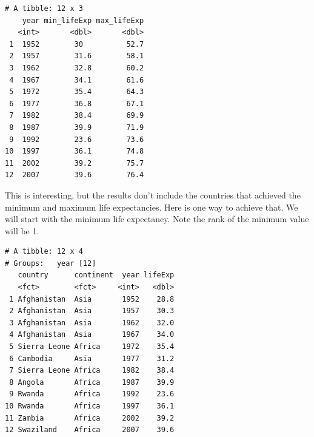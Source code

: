 \documentclass[]{krantz}
\makeatletter
\newenvironment{Shaded}{\begin{snugshade}}{\end{snugshade}}
\newcommand{\KeywordTok}[1]{\textcolor[rgb]{0.27,0.27,0.27}{\textbf{#1}}}
\newcommand{\DataTypeTok}[1]{\textcolor[rgb]{0.27,0.27,0.27}{#1}}
\newcommand{\DecValTok}[1]{\textcolor[rgb]{0.06,0.06,0.06}{#1}}
\newcommand{\StringTok}[1]{\textcolor[rgb]{0.5,0.5,0.5}{#1}}
\newcommand{\OperatorTok}[1]{\textcolor[rgb]{0.43,0.43,0.43}{\textbf{#1}}}
\newcommand{\NormalTok}[1]{#1}
\newenvironment{kframe}{%
\medskip{}
\setlength{\fboxsep}{.8em}
 \def\at@end@of@kframe{}%
 \ifinner\ifhmode%
  \def\at@end@of@kframe{\end{minipage}}%
  \begin{minipage}{\columnwidth}%
 \fi\fi%
 \def\FrameCommand##1{\hskip\@totalleftmargin \hskip-\fboxsep
 \colorbox{shadecolor}{##1}\hskip-\fboxsep
     \hskip-\linewidth \hskip-\@totalleftmargin \hskip\columnwidth}%
 \MakeFramed {\advance\hsize-\width
   \@totalleftmargin\z@ \linewidth\hsize
   \@setminipage}}%
 {\par\unskip\endMakeFramed%
 \at@end@of@kframe}
\renewenvironment{Shaded}{\begin{kframe}}{\end{kframe}}
\makeatother
\begin{document}
\begin{Shaded}
\end{Shaded}

\begin{verbatim}
# A tibble: 12 x 3
    year min_lifeExp max_lifeExp
   <int>       <dbl>       <dbl>
 1  1952        30          52.7
 2  1957        31.6        58.1
 3  1962        32.8        60.2
 4  1967        34.1        61.6
 5  1972        35.4        64.3
 6  1977        36.8        67.1
 7  1982        38.4        69.9
 8  1987        39.9        71.9
 9  1992        23.6        73.6
10  1997        36.1        74.8
11  2002        39.2        75.7
12  2007        39.6        76.4
\end{verbatim}

This is interesting, but the results don't include the countries that
achieved the minimum and maximum life expectancies. Here is one way to
achieve that. We will start with the minimum life expectancy. Note the
rank of the minimum value will be 1.

\begin{Shaded}
\end{Shaded}

\begin{verbatim}
# A tibble: 12 x 4
# Groups:   year [12]
   country      continent  year lifeExp
   <fct>        <fct>     <int>   <dbl>
 1 Afghanistan  Asia       1952    28.8
 2 Afghanistan  Asia       1957    30.3
 3 Afghanistan  Asia       1962    32.0
 4 Afghanistan  Asia       1967    34.0
 5 Sierra Leone Africa     1972    35.4
 6 Cambodia     Asia       1977    31.2
 7 Sierra Leone Africa     1982    38.4
 8 Angola       Africa     1987    39.9
 9 Rwanda       Africa     1992    23.6
10 Rwanda       Africa     1997    36.1
11 Zambia       Africa     2002    39.2
12 Swaziland    Africa     2007    39.6
\end{verbatim}
\end{document}
